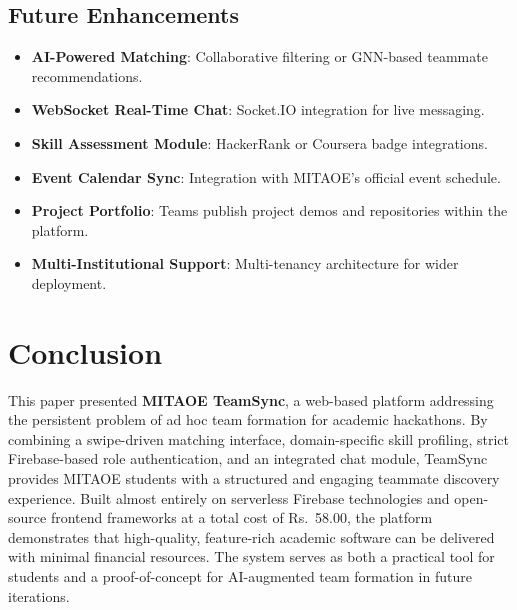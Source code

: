 \documentclass[conference]{IEEEtran}
\begin{document}
\subsection{Future Enhancements}
\begin{itemize}
    \item \textbf{AI-Powered Matching}: Collaborative filtering or GNN-based teammate recommendations.
    \item \textbf{WebSocket Real-Time Chat}: Socket.IO integration for live messaging.
    \item \textbf{Skill Assessment Module}: HackerRank or Coursera badge integrations.
    \item \textbf{Event Calendar Sync}: Integration with MITAOE's official event schedule.
    \item \textbf{Project Portfolio}: Teams publish project demos and repositories within the platform.
    \item \textbf{Multi-Institutional Support}: Multi-tenancy architecture for wider deployment.
\end{itemize}

\section{Conclusion}

This paper presented \textbf{MITAOE TeamSync}, a web-based platform addressing the persistent problem of ad hoc team formation for academic hackathons. By combining a swipe-driven matching interface, domain-specific skill profiling, strict Firebase-based role authentication, and an integrated chat module, TeamSync provides MITAOE students with a structured and engaging teammate discovery experience. Built almost entirely on serverless Firebase technologies and open-source frontend frameworks at a total cost of Rs.~58.00, the platform demonstrates that high-quality, feature-rich academic software can be delivered with minimal financial resources. The system serves as both a practical tool for students and a proof-of-concept for AI-augmented team formation in future iterations.
\end{document}
